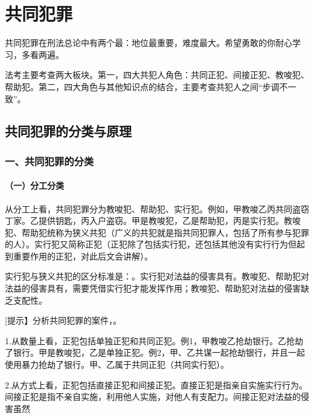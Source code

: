 \chapter{共同犯罪}

\begin{EditionOpeningPanel}
共同犯罪在刑法总论中有两个最：地位最重要，难度最大。希望勇敢的你耐心学习，多看两遍。

法考主要考查两大板块。第一，四大共犯人角色：共同正犯、间接正犯、教唆犯、帮助犯。第二，四大角色与其他知识点的结合，主要考查共犯人之间“步调不一致”。
\end{EditionOpeningPanel}

\section{共同犯罪的分类与原理}

\subsection*{一、共同犯罪的分类}

\subsubsection*{（一）分工分类}

从分工上看，共同犯罪分为教唆犯、帮助犯、实行犯。例如，甲教唆乙丙共同盗窃丁家。乙提供钥匙，丙入户盗窃。甲是教唆犯，乙是帮助犯，丙是实行犯。教唆犯、帮助犯统称为狭义共犯（广义的共犯就是指共同犯罪人，包括了所有参与犯罪的人）。实行犯又简称正犯（正犯除了包括实行犯，还包括其他没有实行行为但起到重要作用的正犯，对此后文会讲解）。

实行犯与狭义共犯的区分标准是：。实行犯对法益的侵害具有。教唆犯、帮助犯对法益的侵害具有，需要凭借实行犯才能发挥作用；教唆犯、帮助犯对法益的侵害缺乏支配性。

[提示】分析共同犯罪的案件，。


1.从数量上看，正犯包括单独正犯和共同正犯。例1，甲教唆乙抢劫银行。乙抢劫了银行。甲是教唆犯，乙是单独正犯。例2，甲、乙共谋一起抢劫银行，并且一起使用暴力抢劫了银行。甲、乙属于共同正犯（共同实行犯）。

2.从方式上看，正犯包括直接正犯和间接正犯。直接正犯是指亲自实施实行行为。间接正犯是指不亲自实施，利用他人实施，对他人有支配力。间接正犯对法益的侵害虽然

